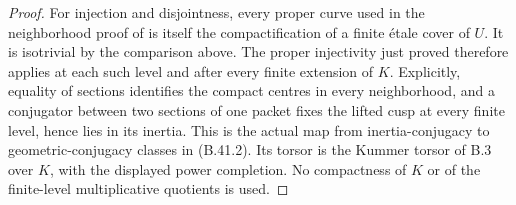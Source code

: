 \begin{proof}
For injection and disjointness, every proper
curve used in the neighborhood proof of
\cite[Theorem 14]{B_StixCuspidal} is itself the
compactification of a finite \'etale cover of
$U$. It is isotrivial by the comparison above.
The proper injectivity just proved therefore
applies at each such level and after every
finite extension of $K$. Explicitly,
equality of sections identifies the compact
centres in every neighborhood, and a conjugator
between two sections of one packet fixes the
lifted cusp at every finite level, hence lies
in its inertia. This is the actual map from
inertia-conjugacy to geometric-conjugacy classes
in (B.41.2). Its torsor is the Kummer torsor
of B.3 over $K$, with the displayed power
completion. No compactness of $K$ or of the
finite-level multiplicative quotients is used.
\end{proof}


